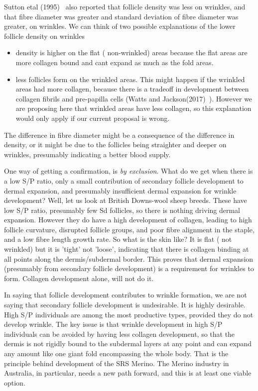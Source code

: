 \documentclass[titlepage]{article}  %
\begin{document}
Sutton etal (1995)~\cite{sutt:95} also reported that follicle density was less on wrinkles, and that fibre diameter was greater and standard deviation of fibre diameter was greater, on wrinkles. We can think of two possible explanations of the lower follicle density on wrinkles
\begin{itemize}
\item density is higher on the flat ( non-wrinkled) areas because the flat areas are more collagen bound and cant expand as much as the fold areas.
\item less follicles form on the wrinkled areas. This might happen if the wrinkled areas had more collagen, because there is a tradeoff in development between collagen fibrils and pre-papilla cells (Watts and Jackson(2017)~\cite{watt:17b}). However we are proposing here that wrinkled areas have less collagen, so this explanation would only apply if our current proposal is wrong.
\end{itemize}
The difference in fibre diameter might be a consequence of the difference in density, or it might be due to the follicles being straighter and deeper on wrinkles, presumably indicating a better blood supply.

One way of getting a confirmation, is {\em by exclusion}. What do we get when there is a low S/P ratio, only a small contribution of secondary follicle development to dermal expansion, and presumably insufficient dermal expansion for wrinkle development? Well, let us look at British Downs-wool sheep breeds. These have low S/P ratio, presumably few Sd follicles, so there is nothing driving dermal expansion. However they do have a high development of collagen, leading to high follicle curvature, disrupted follicle groups, and poor fibre alignment in the staple, and a low fibre length growth rate. So what is the skin like? It is flat ( not wrinkled) but it is 'tight' not 'loose', indicating that there is collagen binding at all points along the dermis/subdermal border. This proves that dermal expansion (presumably from secondary follicle development) is a requirement for wrinkles to form. Collagen development alone, will not do it.

In saying that follicle development contributes to wrinkle formation, we are not saying that secondary follicle development is undesirable. It is highly desirable. High S/P individuals are among the most productive types, provided they do not develop wrinkle. The key issue is that wrinkle development in high S/P individuals can be avoided by having less collagen development, so that the dermis is not rigidly bound to the subdermal layers at any point and can expand any amount like one giant fold encompassing the whole body. That is the principle behind development of the SRS Merino. The Merino industry in Australia, in particular, needs a new path forward, and this is at least one viable option.
\end{document}
